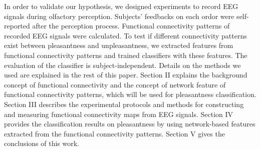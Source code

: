 In order to validate our hypothesis, we designed experiments to record EEG signals during olfactory perception. Subjects' feedbacks on each ordor were self-reported after the perception process. Functional connectivity patterns of recorded EEG signals were calculated. To test if different connectivity patterns exist between pleasantness and unpleasantness, we extracted features from functional connectivity patterns and trained classifiers with these features. The evaluation of the classifier is subject-independent. Details on the methods we used are explained in the rest of this paper. Section II explains the background concept of functional connectivity and the concept of network feature of functional connectivity patterns, which will be used for pleasantness classification. Section III describes the experimental protocols and methods for constructing and measuring functional connectivity maps from EEG signals. Section IV provides the classification results on pleasantness by using network-based features extracted from the functional connectivity patterns. Section V gives the conclusions of this work. 